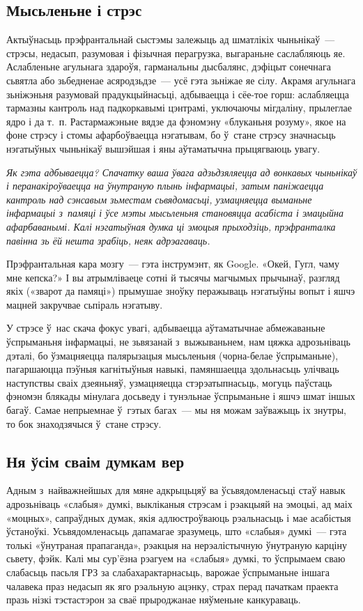 \subsection*{Мысьленьне і стрэс}

Актыўнасьць прэфрантальнай сыстэмы залежыць ад шматлікіх чыньнікаў~--- стрэсы, недасып, разумовая і фізычная перагрузка, выгараньне саслабляюць яе. Аслабленьне агульнага здароўя, гарманальны дысбалянс, дэфіцыт сонечнага сьвятла або зьбедненае асяродзьдзе~--- усё гэта зьніжае яе сілу. Акрамя агульнага зьніжэньня разумовай прадукцыйнасьці, адбываецца і сёе-тое горш: аслабляецца тармазны кантроль над падкоркавымі цэнтрамі, уключаючы мігдаліну, прылеглае ядро і да т.~п. Растармажэньне вядзе да фэномэну «блуканьня розуму», якое на фоне стрэсу і стомы афарбоўваецца нэгатывам, бо ў~стане стрэсу значнасьць нэгатыўных чыньнікаў вышэйшая і яны аўтаматычна прыцягваюць увагу.

\emph{Як гэта адбываецца? Спачатку ваша ўвага адзьдзяляецца ад вонкавых чыньнікаў і перанакіроўваецца на ўнутраную плынь інфармацыі, затым паніжаецца кантроль над сэнсавым зьместам сьвядомасьці, узмацняецца выманьне інфармацыі з~памяці і ўсе мэты мысьленьня становяцца асабіста і эмацыйна афарбаванымі. Калі нэгатыўная думка ці эмоцыя прыходзіць, прэфранталка павінна зь ёй нешта зрабіць, неяк адрэагаваць.}

Прэфрантальная кара мозгу~--- гэта інструмэнт, як Google. «Окей, Гугл, чаму мне кепска?» І вы атрымліваеце сотні й тысячы магчымых прычынаў, разгляд якіх («зварот да памяці») прымушае зноўку перажываць нэгатыўны вопыт і яшчэ мацней закручвае сьпіраль нэгатыву.

У стрэсе ў~нас скача фокус увагі, адбываецца аўтаматычнае абмежаваньне ўспрыманьня інфармацыі, не зьвязанай з~выжываньнем, нам цяжка адрозьніваць дэталі, бо ўзмацняецца палярызацыя мысьленьня (чорна-белае ўспрыманьне), пагаршаюцца пэўныя кагнітыўныя навыкі, памяншаецца здольнасьць улічваць наступствы сваіх дзеяньняў, узмацняецца стэрэатыпнасьць, могуць паўстаць фэномэн блякады мінулага досьведу і тунэльнае ўспрыманьне і яшчэ шмат іншых багаў. Самае непрыемнае ў~гэтых багах~--- мы ня можам заўважыць іх знутры, то бок знаходзячыся ў~стане стрэсу.

\subsection*{Ня ўсім сваім думкам вер}

Адным з~найважнейшых для мяне адкрыцьцяў ва ўсьвядомленасьці стаў навык адрозьніваць «слабыя» думкі, выкліканыя стрэсам і рэакцыяй на эмоцыі, ад маіх «моцных», сапраўдных думак, якія адлюстроўваюць рэальнасьць і мае асабістыя ўстаноўкі. Усьвядомленасьць дапамагае зразумець, што «слабыя» думкі~--- гэта толькі «ўнутраная прапаганда», рэакцыя на нерэалістычную ўнутраную карціну сьвету, фэйк. Калі мы сур'ёзна рэагуем на «слабыя» думкі, то ўспрымаем сваю слабасьць пасьля ГРЗ за слабахарактарнасьць, варожае ўспрыманьне іншага чалавека праз недасып як яго рэальную ацэнку, страх перад пачаткам праекта празь нізкі тэстастэрон за сваё прыроджанае няўменьне канкураваць. 

